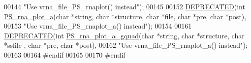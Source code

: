 \begin{DoxyCode}
00144 \textcolor{stringliteral}{"Use vrna\_file\_PS\_rnaplot() instead"});
00145 
00152 \mbox{\hyperlink{plot__structure_8h_aab347a3c03fbe8e7319551b9fa0cce4a}{DEPRECATED}}(\textcolor{keywordtype}{int} \mbox{\hyperlink{plot__structure_8h_a47856b2504b566588785597b6ebb8271}{PS\_rna\_plot\_a}}(\textcolor{keywordtype}{char} *\textcolor{keywordtype}{string}, \textcolor{keywordtype}{char} *structure, \textcolor{keywordtype}{char} *file, \textcolor{keywordtype}{char} *pre, \textcolor{keywordtype}{
      char} *post),
00153 \textcolor{stringliteral}{"Use vrna\_file\_PS\_rnaplot\_a() instead"});
00154 
00161 \mbox{\hyperlink{plot__structure_8h_aab347a3c03fbe8e7319551b9fa0cce4a}{DEPRECATED}}(\textcolor{keywordtype}{int} \mbox{\hyperlink{plot__structure_8h_a32fa0f97625119e9d24dd2e7153abc4f}{PS\_rna\_plot\_a\_gquad}}(\textcolor{keywordtype}{char} *\textcolor{keywordtype}{string}, \textcolor{keywordtype}{char} *structure, \textcolor{keywordtype}{char} *ssfile
      , \textcolor{keywordtype}{char} *pre, \textcolor{keywordtype}{char} *post),
00162 \textcolor{stringliteral}{"Use vrna\_file\_PS\_rnaplot\_a() instead"});
00163 
00164 \textcolor{preprocessor}{#endif}
00165 
00170 \textcolor{preprocessor}{#endif}
\end{DoxyCode}

